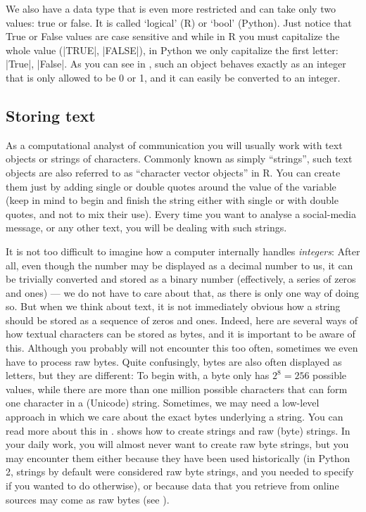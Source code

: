 We also have a data type that is even more restricted and can take
only two values: true or false. It is called `logical' (R) or `bool'
(Python).  Just notice that True or False values are case sensitive
and while in R you must capitalize the whole value (|TRUE|, |FALSE|), in
Python we only capitalize the first letter: |True|, |False|.  As you can
see in , such an object behaves exactly as an integer that
is only allowed to be 0 or 1, and it can easily be converted to an
integer.





\subsection{Storing text}

As a computational analyst of communication you will usually work with
text objects or strings of characters. Commonly known as simply ``strings'',
such text objects are also referred to as ``character vector objects'' in R.
You can create them just by adding single or double quotes around the value of the variable (keep in mind to begin and finish the string either with single or with double quotes, and not to mix their use). Every time you want to analyse a social-media message, or any other text, you will be dealing with such strings. 


It is not too difficult to imagine how a computer internally
handles \emph{integers}: After all, even though the number may be displayed
as a decimal number to us, it can be trivially converted and stored
as a binary number (effectively, a series of zeros and ones)
--- we do not have to care about that, as there
is only one way of doing so. But when we think about text, it is not
immediately obvious how a string should be stored as a sequence of
zeros and ones.
Indeed, here are several ways of how textual characters can be stored as
bytes, and it is important to be aware of this.
Although you probably will not encounter this too often, sometimes
we even have to process raw bytes. Quite confusingly, bytes are also often
displayed as letters, but they are different: To begin with, a byte
only has $2^8=256$ possible values, while there are more than one
million possible characters that can form one character in a (Unicode)
string. Sometimes, we  may need a low-level approach in which we care about the exact
bytes underlying a string. You can read more about this in
.   shows how to create strings and raw
(byte) strings. In your daily work, you will almost never want to
create raw byte strings, but you may encounter them either because
they have been used historically (in Python 2, strings by default
were considered raw byte strings, and you needed to specify if
you wanted to do otherwise), or because data that you retrieve from
online sources may come as raw bytes (see ).

